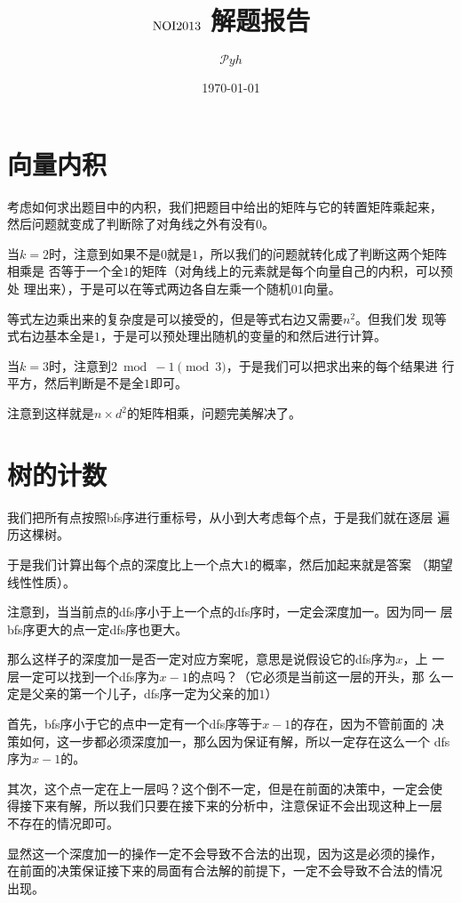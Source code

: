 \documentclass[a4paper]{article}
\date{\today}
\title{$\rm NOI2013$ 解题报告}
\author{$\mathcal Pyh$}
\newcommand{\kai}{\CJKfamily{kai}}
\begin{document}
\maketitle

\kai

\section{向量内积}

考虑如何求出题目中的内积，我们把题目中给出的矩阵与它的转置矩阵乘起来，
然后问题就变成了判断除了对角线之外有没有$0$。

当$k=2$时，注意到如果不是$0$就是$1$，所以我们的问题就转化成了判断这两个矩阵相乘是
否等于一个全$1$的矩阵（对角线上的元素就是每个向量自己的内积，可以预处
理出来），于是可以在等式两边各自左乘一个随机01向量。

等式左边乘出来的复杂度是可以接受的，但是等式右边又需要$n^2$。但我们发
现等式右边基本全是$1$，于是可以预处理出随机的变量的和然后进行计算。

当$k=3$时，注意到$2\bmod -1\pmod{3}$，于是我们可以把求出来的每个结果进
行平方，然后判断是不是全$1$即可。

注意到这样就是$n\times d^2$的矩阵相乘，问题完美解决了。

\section{树的计数}

我们把所有点按照bfs序进行重标号，从小到大考虑每个点，于是我们就在逐层
遍历这棵树。

于是我们计算出每个点的深度比上一个点大$1$的概率，然后加起来就是答案
（期望线性性质）。

注意到，当当前点的dfs序小于上一个点的dfs序时，一定会深度加一。因为同一
层bfs序更大的点一定dfs序也更大。

那么这样子的深度加一是否一定对应方案呢，意思是说假设它的dfs序为$x$，上
一层一定可以找到一个dfs序为$x-1$的点吗？（它必须是当前这一层的开头，那
么一定是父亲的第一个儿子，dfs序一定为父亲的加$1$）

首先，bfs序小于它的点中一定有一个dfs序等于$x-1$的存在，因为不管前面的
决策如何，这一步都必须深度加一，那么因为保证有解，所以一定存在这么一个
dfs序为$x-1$的。

其次，这个点一定在上一层吗？这个倒不一定，但是在前面的决策中，一定会使
得接下来有解，所以我们只要在接下来的分析中，注意保证不会出现这种上一层
不存在的情况即可。

显然这一个深度加一的操作一定不会导致不合法的出现，因为这是必须的操作，
在前面的决策保证接下来的局面有合法解的前提下，一定不会导致不合法的情况
出现。
\end{document}
